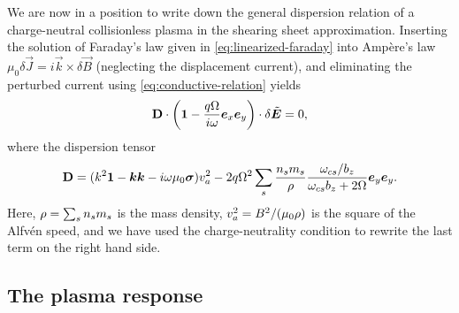\documentclass[aps,pre,notitlepage,amsmath,amssymb,amsfonts,nobibnotes,nofootinbib,superscriptaddress]{revtex4-1}
\begin{document}
We are now in a position to write down the general dispersion relation of a
charge-neutral collisionless plasma in the shearing sheet approximation.
Inserting the solution of Faraday's law given in \cref{eq:linearized-faraday}
into Ampère's law $\mu_0\delta\vec{J}=i\vec{k}\times\delta\vec{B}$ (neglecting
the displacement current), and eliminating the perturbed current using
\cref{eq:conductive-relation} yields
\begin{equation}
  \label{eq:dispersion-relation}
  \mathbf{D}\cdot\left(
    \mathbf{1} - \frac{q\Omega}{i\omega}\ex\ey
  \right)\cdot\delta\tvec{E} = 0,
\end{equation}
where the dispersion tensor
\begin{equation}
  \label{eq:dispersion-tensor}
  \mathbf{D} =
  (k^2\mathbf{1} - \vec{k}\vec{k} - i\omega\mu_0\vec{\sigma})\va^2
  - 2q\Omega^2\sums\frac{n_s m_s}{\rho}
  \frac{\omcs/b_z}{\omcs b_z + 2\Omega}\ey\ey.
\end{equation}
Here, $\rho=\sum_s{}n_s{}m_s$ is the mass density, $v_a^2=B^2/(\mu_0\rho)$ is
the square of the Alfvén speed, and we have used the charge-neutrality
condition to rewrite the last term on the right hand side.

\subsection{The plasma response}
\label{sec:plasma-response}
\end{document}
